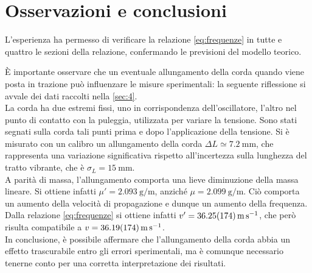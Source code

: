 \section{Osservazioni e conclusioni}

L'esperienza ha permesso di verificare la relazione \eqref{eq:frequenze} in tutte e quattro le sezioni della relazione, confermando le previsioni del modello teorico.

È importante osservare che un eventuale allungamento della corda quando viene posta in trazione può influenzare le misure sperimentali: la seguente riflessione si avvale dei dati raccolti nella \cref{sec:4}.\\
La corda ha due estremi fissi, uno in corrispondenza dell'oscillatore, l'altro nel punto di contatto con la puleggia, utilizzata per variare la tensione. Sono stati segnati sulla corda tali punti prima e dopo l'applicazione della tensione. Si è misurato con un calibro un allungamento della corda $\Delta L \simeq \qty{7.2}{\milli\meter}$, che rappresenta una variazione significativa rispetto all'incertezza sulla lunghezza del tratto vibrante, che è $\sigma_L = \qty{15}{\milli\meter}$.\\
A parità di massa, l'allungamento comporta una lieve diminuzione della massa lineare. Si ottiene infatti $\mu' = \qty{2.093}{\gram\per\meter}$, anziché $\mu = \qty{2.099}{\gram\per\meter}$. Ciò comporta un aumento della velocità di propagazione e dunque un aumento della frequenza. Dalla relazione \eqref{eq:frequenze} si ottiene infatti $v' = \qty{36.25 \pm 1.74}{\meter\per\second}$, che però risulta compatibile a $v = \qty{36.19 \pm 1.74}{\meter\per\second}$.\\
In conclusione, è possibile affermare che l'allungamento della corda abbia un effetto trascurabile entro gli errori sperimentali, ma è comunque necessario tenerne conto per una corretta interpretazione dei risultati.
\newpage